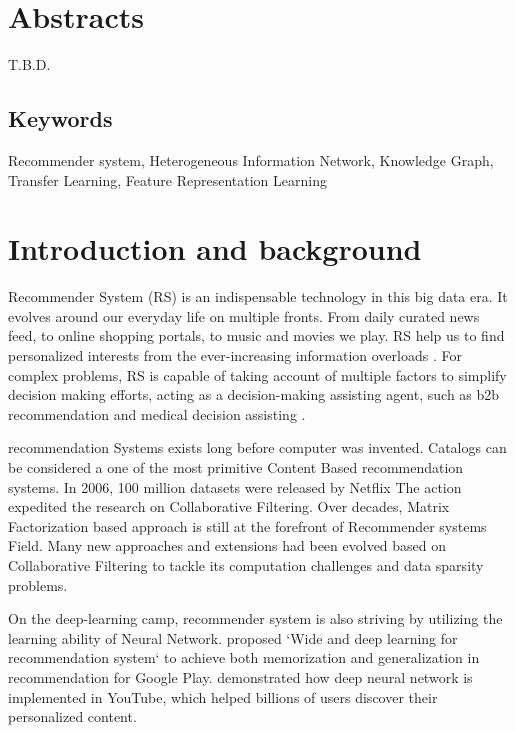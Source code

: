 
\section*{Abstracts}
T.B.D.

\subsection*{Keywords} 
Recommender system, Heterogeneous Information Network, Knowledge Graph, Transfer Learning, Feature Representation Learning

\section{Introduction and background}
Recommender System (RS) is an indispensable technology in this big data era. It evolves around our everyday life on multiple fronts. 
From daily curated news feed, to online shopping portals, to music and movies we play. RS help us to find personalized interests from the ever-increasing information overloads \citep{Lu2015}. 
For complex problems, RS is capable of taking account of multiple factors to simplify decision making efforts, acting as a decision-making assisting agent, such as b2b recommendation \citep{shambour2012trust} and medical decision assisting \citep{zhang2017idoctor}.

recommendation Systems exists long before computer was invented. Catalogs can be considered a one of the most primitive Content Based recommendation systems. In 2006, 100 million datasets were released by Netflix \citep{Bennett2007} The action expedited the research on Collaborative Filtering. Over decades, Matrix Factorization based approach is still at the forefront of Recommender systems Field. Many new approaches and extensions had been evolved based on Collaborative Filtering to tackle its computation challenges and data sparsity problems. 

On the deep-learning camp, recommender system is also striving by utilizing the learning ability of Neural Network. \citet{Cheng2016} proposed `Wide and deep learning for recommendation system` to achieve both memorization and generalization in recommendation for Google Play. \citet{Covington2016} demonstrated how deep neural network is implemented in YouTube, which helped billions of users discover their personalized content.

